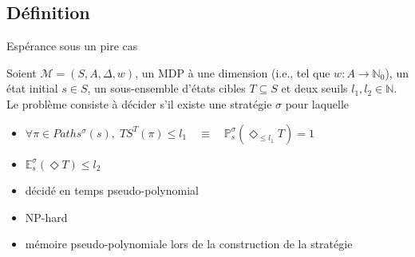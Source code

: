 \documentclass[compress]{beamer}
\begin{document}
\subsection{Définition}
\begin{frame}{Espérance sous un pire cas}
  \small
  \begin{definition}[SSP-WE]
    Soient $\mathcal{M}=(S, A, \Delta, w)$, un MDP à une dimension (i.e., tel que $w : A \rightarrow \mathbb{N}_0$), un état initial $s \in S$, un sous-ensemble d'états cibles $T \subseteq S$ et deux seuils $l_1, l_2 \in \mathbb{N}$.
    Le problème consiste à décider s'il existe une stratégie $\sigma$ pour laquelle
    \begin{itemize}
      \item $\forall \pi \in Paths^\sigma(s), \; TS^T(\pi) \leq l_1 \quad
        \equiv \quad \mathbb{P}^\sigma_s(\Diamond_{\leq l_1} T) = 1$
      \item $\mathbb{E}_s^\sigma(\Diamond T) \leq l_2$
    \end{itemize}
  \end{definition}
  \begin{itemize}
    \item décidé en temps {\color{fibeamer@orange}pseudo-polynomial}
    \item NP-hard
    \item mémoire pseudo-polynomiale lors de la construction de la stratégie
  \end{itemize}
\end{frame}
\end{document}
